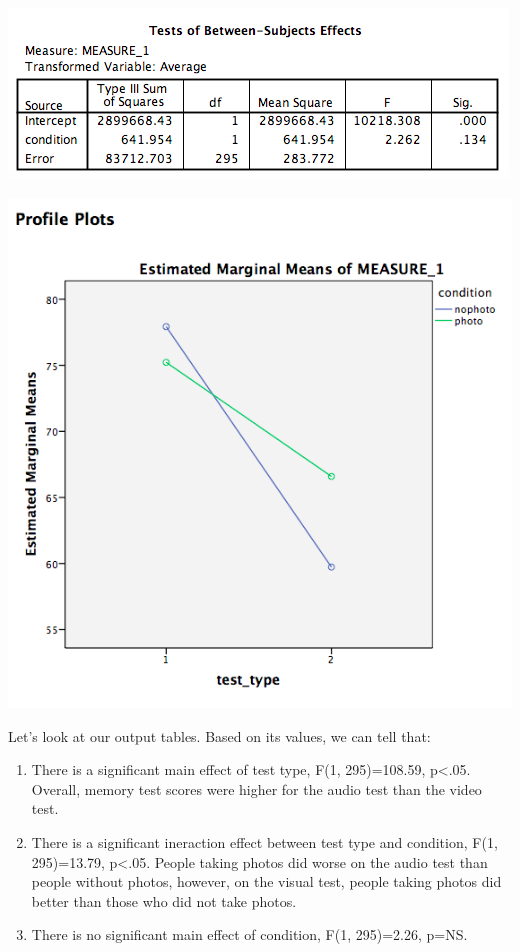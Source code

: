 \documentclass[
]{book}
\begin{document}
\includegraphics{img/11.4.18.png}

\includegraphics{img/11.4.19.png}

Let's look at our output tables. Based on its values, we can tell that:

\begin{enumerate}
\def\labelenumi{\arabic{enumi}.}
\item
  There is a significant main effect of test type, F(1, 295)=108.59, p\textless.05. Overall, memory test scores were higher for the audio test than the video test.
\item
  There is a significant ineraction effect between test type and condition, F(1, 295)=13.79, p\textless.05. People taking photos did worse on the audio test than people without photos, however, on the visual test, people taking photos did better than those who did not take photos.
\item
  There is no significant main effect of condition, F(1, 295)=2.26, p=NS.
\end{enumerate}
\end{document}
